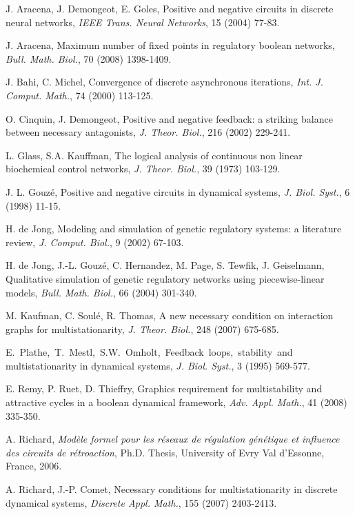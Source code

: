 \documentclass[11pt]{article}
\begin{document}
\begin{thebibliography}{7}

J. Aracena, J. Demongeot, E. Goles, Positive and negative circuits in
discrete neural networks, {\emph{IEEE Trans. Neural
Networks}}, 15 (2004) 77-83.

J. Aracena, Maximum number of fixed points in regulatory boolean
networks, {\emph{Bull. Math. Biol.}}, 70 (2008)
1398-1409.

J. Bahi, C. Michel, Convergence of discrete asynchronous iterations,
{\emph{Int. J. Comput. Math.}}, 74 (2000) 113-125.

O. Cinquin, J. Demongeot, Positive and negative feedback: a striking
balance between necessary antagonists, {\emph{J. Theor. Biol.}}, 216
(2002) 229-241.

L. Glass, S.A. Kauffman, The logical analysis of continuous non linear
biochemical control networks, {\emph{J. Theor. Biol.}},
39 (1973) 103-129.

J. L. Gouz\'e, Positive and negative circuits in dynamical systems,
{\emph{J. Biol. Syst.}}, 6 (1998) 11-15.

H. de Jong, Modeling and simulation of genetic regulatory systems: a
literature review, {\emph{J. Comput. Biol.}}, 9 (2002)
67-103.

H. de Jong, J.-L. Gouz\'e, C. Hernandez, M. Page, S. Tewfik,
J. Geiselmann, Qualitative simulation of genetic regulatory networks
using piecewise-linear models, {\emph{Bull. Math. Biol.}}, 66 (2004) 301-340.

M. Kaufman, C. Soul\'e, R. Thomas, A new necessary condition on
interaction graphs for multistationarity, {\emph{J.
Theor. Biol.}}, 248 (2007) 675-685.

E.~Plathe,~T.~Mestl,~S.W.~Omholt,~Feedback~loops,~stability~and
multistationarity in dynamical systems, {\emph{J. Biol. Syst.}}, 3
(1995) 569-577.

E. Remy, P. Ruet, D. Thieffry, Graphics requirement for multistability
and attractive cycles in a boolean dynamical framework,
{\emph{Adv. Appl. Math.}}, 41 (2008) 335-350.

A. Richard, {\emph{Mod\`ele formel pour les r\'eseaux de r\'egulation
g\'en\'etique et influence des circuits de r\'etroaction}},
Ph.D. Thesis, University of Evry Val d'Essonne, France, 2006.

A. Richard, J.-P. Comet, Necessary conditions for multistationarity in
discrete dynamical systems, {\emph{Discrete Appl. Math.}}, 155 (2007)
2403-2413.


\end{thebibliography}
\end{document}
